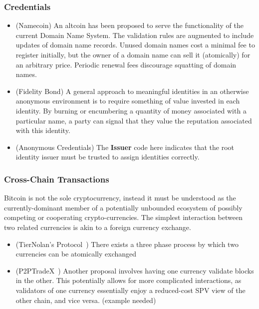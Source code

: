 \subsubsection{Credentials}

\begin{itemize}
\item (Namecoin) An altcoin has been proposed to serve the functionality of the current Domain Name System. The validation rules are augmented to include updates of domain name records. Unused domain names cost a minimal fee to register initially, but the owner of a domain name can sell it (atomically) for an arbitrary price. Periodic renewal fees discourage squatting of domain names.
\item (Fidelity Bond) A general approach to meaningful identities in an otherwise anonymous environment is to require something of value invested in each identity. By burning or encumbering a quantity of money associated with a particular name, a party can signal that they value the reputation associated with this identity.
\item (Anonymous Credentials) The {\bf Issuer} code here indicates that the root identity issuer must be trusted to assign identities correctly.
\end{itemize}

\subsubsection{Cross-Chain Transactions}
Bitcoin is not the sole cryptocurrency, instead it must be understood as the currently-dominant member of a potentially unbounded ecosystem of possibly competing or cooperating crypto-currencies. The simplest interaction between two related currencies is akin to a foreign currency exchange.

\begin{itemize}
\item (TierNolan's Protocol~\cite{tiernolan}) There exists a three phase process by which two currencies can be atomically exchanged
\item (P2PTradeX~\cite{p2ptradex}) Another proposal involves having one currency validate blocks in the other. This potentially allows for more complicated interactions, as validators of one currency essentially enjoy a reduced-cost SPV view of the other chain, and vice versa. (example needed)
\end{itemize}

